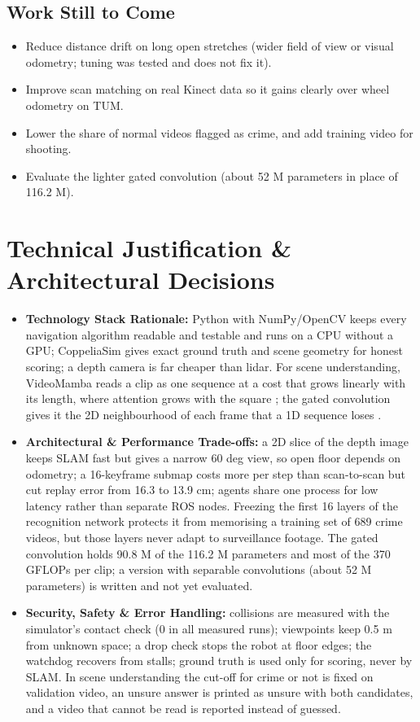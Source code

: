 \documentclass[11pt, a4paper]{article}
\begin{document}
\subsection{Work Still to Come}
\begin{itemize}[noitemsep, topsep=2pt]
    \item Reduce distance drift on long open stretches (wider field of view or visual odometry; tuning was tested and does not fix it).
    \item Improve scan matching on real Kinect data so it gains clearly over wheel odometry on TUM.
    \item Lower the share of normal videos flagged as crime, and add training video for shooting.
    \item Evaluate the lighter gated convolution (about 52 M parameters in place of 116.2 M).
\end{itemize}

\section{Technical Justification \& Architectural Decisions}
\begin{itemize}[noitemsep, topsep=2pt]
    \item \textbf{Technology Stack Rationale:} Python with NumPy/OpenCV keeps every navigation algorithm readable and testable and runs on a CPU without a GPU; CoppeliaSim gives exact ground truth and scene geometry for honest scoring; a depth camera is far cheaper than lidar. For scene understanding, VideoMamba reads a clip as one sequence at a cost that grows linearly with its length, where attention grows with the square \cite{li2024videomamba,gu2023}; the gated convolution gives it the 2D neighbourhood of each frame that a 1D sequence loses \cite{rao2022}.
    \item \textbf{Architectural \& Performance Trade-offs:} a 2D slice of the depth image keeps SLAM fast but gives a narrow 60 deg view, so open floor depends on odometry; a 16-keyframe submap costs more per step than scan-to-scan but cut replay error from 16.3 to 13.9 cm; agents share one process for low latency rather than separate ROS nodes. Freezing the first 16 layers of the recognition network protects it from memorising a training set of 689 crime videos, but those layers never adapt to surveillance footage. The gated convolution holds 90.8 M of the 116.2 M parameters and most of the 370 GFLOPs per clip; a version with separable convolutions (about 52 M parameters) is written and not yet evaluated.
    \item \textbf{Security, Safety \& Error Handling:} collisions are measured with the simulator's contact check (0 in all measured runs); viewpoints keep 0.5 m from unknown space; a drop check stops the robot at floor edges; the watchdog recovers from stalls; ground truth is used only for scoring, never by SLAM. In scene understanding the cut-off for crime or not is fixed on validation video, an unsure answer is printed as unsure with both candidates, and a video that cannot be read is reported instead of guessed.
\end{itemize}
\end{document}
